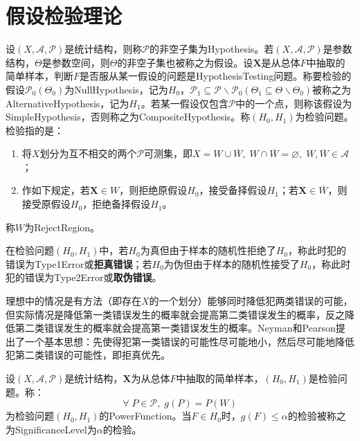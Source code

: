 \chapter{假设检验理论}
\begin{definition}
	设$(X,\mathscr{A},\mathscr{P})$是统计结构，则称$\mathscr{P}$的非空子集为\gls{Hypothesis}。若$(X,\mathscr{A},\mathscr{P})$是参数结构，$\Theta$是参数空间，则$\Theta$的非空子集也被称之为假设。设$\mathbf{X}$是从总体$F$中抽取的简单样本，判断$F$是否服从某一假设的问题是\gls{HypothesisTesting}问题。称要检验的假设$\mathscr{P}_0(\Theta_0)$为\gls{NullHypothesis}，记为$H_0$，$\mathscr{P_1}\subseteq\mathscr{P}\backslash\mathscr{P}_0(\Theta_1\subseteq\Theta\backslash\Theta_0)$被称之为\gls{AlternativeHypothesis}，记为$H_1$。若某一假设仅包含$\mathscr{P}$中的一个点，则称该假设为\gls{SimpleHypothesis}，否则称之为\gls{CompositeHypothesis}。称$(H_0,H_1)$为检验问题。检验指的是：
	\begin{enumerate}
		\item 将$X$划分为互不相交的两个$\mathscr{P}$可测集，即$X=W\cup\overline{W},\;W\cap\overline{W}=\varnothing,\;W,\overline{W}\in\mathscr{A}$；
		\item 作如下规定，若$\mathbf{X}\in W$，则拒绝原假设$H_0$，接受备择假设$H_1$；若$\mathbf{X}\in\overline{W}$，则接受原假设$H_0$，拒绝备择假设$H_1$。
	\end{enumerate}
	称$W$为\gls{RejectRegion}。
\end{definition}
\begin{definition}
	在检验问题$(H_0,H_1)$中，若$H_0$为真但由于样本的随机性拒绝了$H_0$，称此时犯的错误为\gls{Type1Error}或\textbf{拒真错误}；若$H_0$为伪但由于样本的随机性接受了$H_0$，称此时犯的错误为\gls{Type2Error}或\textbf{取伪错误}。
\end{definition}
\begin{note}
	理想中的情况是有方法（即存在$X$的一个划分）能够同时降低犯两类错误的可能，但实际情况是降低第一类错误发生的概率就会提高第二类错误发生的概率，反之降低第二类错误发生的概率就会提高第一类错误发生的概率。Neyman和Pearson提出了一个基本思想：先使得犯第一类错误的可能性尽可能地小，然后尽可能地降低犯第二类错误的可能性，即拒真优先。
\end{note}
\begin{definition}
	设$(X,\mathscr{A},\mathscr{P})$是统计结构，$\mathbf{X}$为从总体$F$中抽取的简单样本，$(H_0,H_1)$是检验问题。称：
	\begin{equation*}
		\forall\;P\in\mathscr{P},\;g(P)=P(W)
	\end{equation*}
	为检验问题$(H_0,H_1)$的\gls{PowerFunction}。当$F\in H_0$时，$g(F)\leqslant\alpha$的检验被称之为\gls{SignificanceLevel}为$\alpha$的检验。
\end{definition}
